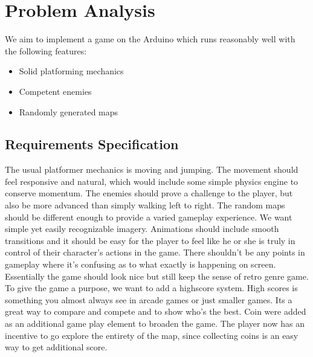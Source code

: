 \chapter{Problem Analysis}
We aim to implement a game on the Arduino which runs reasonably well with the following features:
\begin{itemize}
\item Solid platforming mechanics
\item Competent enemies
\item Randomly generated maps
\end{itemize}

\section{Requirements Specification}
The usual platformer mechanics is moving and jumping. The movement should feel responsive and natural, which would include some simple physics engine to conserve momentum.
\newline
The enemies should prove a challenge to the player, but also be more advanced than simply walking left to right.
\newline
The random maps should be different enough to provide a varied gameplay experience.
\newline
We want simple yet easily recognizable imagery. Animations should include smooth transitions and it should be easy for the player to feel like he or she is truly in control of their character's actions in the game. There shouldn't be any points in gameplay where it's confusing as to what exactly is happening on screen. Essentially the game should look nice but still keep the sense of retro genre game. To give the game a purpose, we want to add a highscore system. High scores is something you almost always see in arcade games or just smaller games. Its a great way to compare and compete and to show who's the best.
\newline
Coin were added as an additional game play element to broaden the game. The player now has an incentive to go explore the entirety of the map, since collecting coins is an easy way to get additional score.
